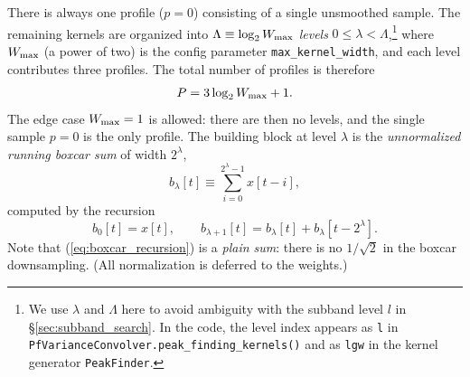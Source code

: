\documentclass{article}
\numberwithin{equation}{section}   %
\begin{document}
There is always one profile ($p=0$) consisting of a single unsmoothed sample. The remaining
kernels are organized into $\Lambda \equiv \log_2 W_{\rm max}$ {\em levels} $0 \le \lambda < \Lambda$,\footnote{We use $\lambda$ and $\Lambda$ here to avoid ambiguity with the subband level $l$ in \S\ref{sec:subband_search}. In the code, the level index appears as {\tt l} in {\tt PfVarianceConvolver.peak\_finding\_kernels()} and as {\tt lgw} in the kernel generator {\tt PeakFinder}.} where
$W_{\rm max}$ (a power of two) is the config parameter \verb|max_kernel_width|, and each level
contributes three profiles. The total number of profiles is therefore
\begin{equation}
P = 3 \log_2 W_{\rm max} + 1.
\end{equation}
The edge case $W_{\rm max}=1$ is allowed: there are then no levels, and the single sample
$p=0$ is the only profile.
The building block at level $\lambda$ is the {\em unnormalized running boxcar sum} of width $2^\lambda$,
\begin{equation}
b_\lambda[t] \equiv \sum_{i=0}^{2^\lambda - 1} x[t-i],
\end{equation}
computed by the recursion
\begin{equation}
b_0[t] = x[t], \qquad b_{\lambda+1}[t] = b_\lambda[t] + b_\lambda[t - 2^\lambda].
\label{eq:boxcar_recursion}
\end{equation}
Note that (\ref{eq:boxcar_recursion}) is a {\em plain sum}: there is no $1/\sqrt2$ in the boxcar
downsampling. (All normalization is deferred to the weights.)
\end{document}

